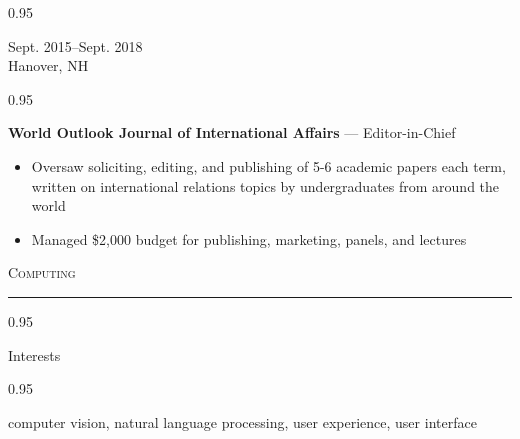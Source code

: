 \documentclass[a4paper,9pt]{article}
\newcommand{\mainMarginBottom}{\vspace*{1.5pt}}
\newcommand{\newLine}{\\}
\newcommand{\doubleColumnGap}{\hspace{4mm}}
\newcommand{\sectionMarginTopBottom}{\vspace*{9pt}}
\newcommand{\sectionMarginBetweenRemove}{\vspace{-5ex}}
\newcommand{\sectionMarginBetweenAdd}{\vspace{20pt}}
\newcommand{\mainLineSpacing}{0.95}
\def\hrulefill{\leavevmode\leaders\hrule height 1.75pt\hfill\kern0pt}
\begin{document}
\begin{minipage}[t]{0.20\linewidth}
  \begin{small}
    \begin{spacing}\mainLineSpacing{}
      \begin{flushright}
        Sept. 2015--Sept. 2018
        \newLine{}
        \mainMarginBottom{}
        Hanover, NH
      \end{flushright}
    \end{spacing}
  \end{small}
\end{minipage}
\doubleColumnGap{}
\begin{minipage}[t]{0.75\linewidth}
  \begin{small}
    \begin{spacing}\mainLineSpacing{}
      \begin{flushleft}
        \textbf{World Outlook Journal of International Affairs} --- Editor-in-Chief
        \mainMarginBottom{}
        \begin{itemize}[itemsep=0pt,topsep=0pt,leftmargin=*]
          \item Oversaw soliciting, editing, and publishing of 5-6 academic papers each term, written on international relations
                topics by undergraduates from around the world
          \item Managed \$2,000 budget for publishing, marketing, panels, and lectures
        \end{itemize}
      \end{flushleft}
    \end{spacing}
  \end{small}
\end{minipage}

\sectionMarginBetweenRemove{}
\sectionMarginBetweenAdd{}

\hspace*{9pt}\textsc{\fontsize{20}{24}\selectfont Computing}\hspace*{14pt}\hrulefill
\sectionMarginTopBottom{}

\begin{minipage}[t]{0.20\linewidth}
  \begin{small}
    \begin{spacing}\mainLineSpacing{}
      \begin{flushright}
        Interests
      \end{flushright}
    \end{spacing}
  \end{small}
\end{minipage}
\doubleColumnGap{}
\begin{minipage}[t]{0.75\linewidth}
  \begin{small}
    \begin{spacing}\mainLineSpacing{}
      \begin{flushleft}
        computer vision, natural language processing, user experience, user interface
      \end{flushleft}
    \end{spacing}
  \end{small}
\end{minipage}
\end{document}
